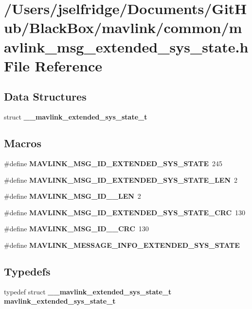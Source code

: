 \section{/\+Users/jselfridge/\+Documents/\+Git\+Hub/\+Black\+Box/mavlink/common/mavlink\+\_\+msg\+\_\+extended\+\_\+sys\+\_\+state.h File Reference}
\label{mavlink__msg__extended__sys__state_8h}
\subsection*{Data Structures}
\begin{DoxyCompactItemize}
\item 
struct \textbf{ \+\_\+\+\_\+mavlink\+\_\+extended\+\_\+sys\+\_\+state\+\_\+t}
\end{DoxyCompactItemize}
\subsection*{Macros}
\begin{DoxyCompactItemize}
\item 
\#define \textbf{ M\+A\+V\+L\+I\+N\+K\+\_\+\+M\+S\+G\+\_\+\+I\+D\+\_\+\+E\+X\+T\+E\+N\+D\+E\+D\+\_\+\+S\+Y\+S\+\_\+\+S\+T\+A\+TE}~245
\item 
\#define \textbf{ M\+A\+V\+L\+I\+N\+K\+\_\+\+M\+S\+G\+\_\+\+I\+D\+\_\+\+E\+X\+T\+E\+N\+D\+E\+D\+\_\+\+S\+Y\+S\+\_\+\+S\+T\+A\+T\+E\+\_\+\+L\+EN}~2
\item 
\#define \textbf{ M\+A\+V\+L\+I\+N\+K\+\_\+\+M\+S\+G\+\_\+\+I\+D\+\_\+\_\+\+L\+EN}~2
\item 
\#define \textbf{ M\+A\+V\+L\+I\+N\+K\+\_\+\+M\+S\+G\+\_\+\+I\+D\+\_\+\+E\+X\+T\+E\+N\+D\+E\+D\+\_\+\+S\+Y\+S\+\_\+\+S\+T\+A\+T\+E\+\_\+\+C\+RC}~130
\item 
\#define \textbf{ M\+A\+V\+L\+I\+N\+K\+\_\+\+M\+S\+G\+\_\+\+I\+D\+\_\+\_\+\+C\+RC}~130
\item 
\#define \textbf{ M\+A\+V\+L\+I\+N\+K\+\_\+\+M\+E\+S\+S\+A\+G\+E\+\_\+\+I\+N\+F\+O\+\_\+\+E\+X\+T\+E\+N\+D\+E\+D\+\_\+\+S\+Y\+S\+\_\+\+S\+T\+A\+TE}
\end{DoxyCompactItemize}
\subsection*{Typedefs}
\begin{DoxyCompactItemize}
\item 
typedef struct \textbf{ \+\_\+\+\_\+mavlink\+\_\+extended\+\_\+sys\+\_\+state\+\_\+t} \textbf{ mavlink\+\_\+extended\+\_\+sys\+\_\+state\+\_\+t}
\end{DoxyCompactItemize}


